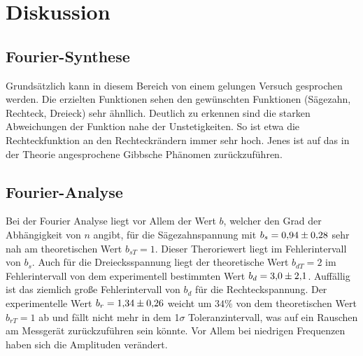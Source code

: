 \section{Diskussion}
\label{sec:Diskussion}
\subsection{Fourier-Synthese}
Grundsätzlich kann in diesem Bereich von einem gelungen Versuch gesprochen werden. 
Die erzielten Funktionen sehen den gewünschten Funktionen (Sägezahn, Rechteck,
Dreieck) sehr ähnllich. Deutlich zu erkennen sind die starken Abweichungen der
Funktion nahe der Unstetigkeiten. So ist etwa die Rechteckfunktion an den
Rechteckrändern immer sehr hoch.
Jenes ist auf das in der Theorie angesprochene Gibbsche Phänomen zurückzuführen.

\subsection{Fourier-Analyse}
Bei der Fourier Analyse liegt vor Allem der Wert $b$, welcher den Grad der 
Abhängigkeit von $n$ angibt, für die Sägezahnspannung mit $b_s = \num{0.94+-0.28}$
sehr nah am theoretischen Wert $b_{sT} = 1$. Dieser Theroriewert liegt im 
Fehlerintervall von $b_s$. Auch für die Dreiecksspannung 
liegt der theoretische Wert $b_{dT} = 2$ im Fehlerintervall von dem experimentell 
bestimmten Wert $b_d = \num{3.0+-2.1}$. Auffällig ist das ziemlich große
Fehlerintervall von $b_d$ für die Rechteckspannung. Der experimentelle Wert
$b_r = \num{1.34+-0.26}$ weicht um $34 \% $ von dem theoretischen Wert 
$b_{rT} = 1$ ab und fällt nicht mehr in dem 1$\sigma$ Toleranzintervall, was auf ein 
Rauschen am Messgerät zurückzuführen sein könnte. Vor Allem bei niedrigen 
Frequenzen haben sich die Amplituden verändert. 